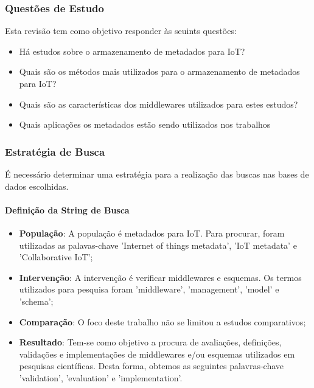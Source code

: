 \subsubsection{Questões de Estudo}
\quad Esta revisão tem como objetivo responder às seuints questões:
\begin{itemize}
  \item Há estudos sobre o armazenamento de metadados para \acrlong{IoT}?
  \item Quais são os métodos mais utilizados para o armazenamento de metadados para \acrshort{IoT}?
  \item Quais são as características dos middlewares utilizados para estes estudos?
  \item Quais aplicações os metadados estão sendo utilizados nos trabalhos
\end{itemize}

\subsubsection{Estratégia de Busca}
\quad É necessário determinar uma estratégia para a realização das buscas nas bases de dados escolhidas.

\paragraph{Definição da String de Busca}
\begin{itemize}
  \item \textbf{População}: A população é metadados para \acrshort{IoT}. Para procurar, foram utilizadas as palavas-chave 'Internet of things metadata', 'IoT metadata' e 'Collaborative IoT';
  \item \textbf{Intervenção}: A intervenção é verificar middlewares e esquemas. Os termos utilizados para pesquisa foram 'middleware', 'management', 'model' e 'schema';
  \item \textbf{Comparação}: O foco deste trabalho não se limitou a estudos comparativos;
  \item \textbf{Resultado}: Tem-se como objetivo a procura de avaliações, definições, validações e implementações de middlewares e/ou esquemas utilizados em pesquisas científicas. Desta forma, obtemos as seguintes palavras-chave
  'validation', 'evaluation' e 'implementation'.
\end{itemize}

